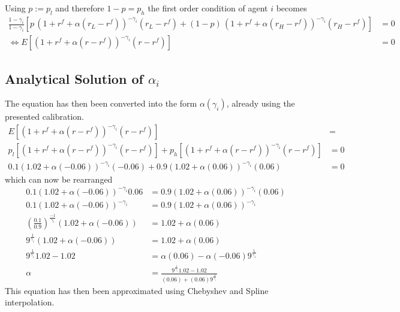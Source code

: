 \documentclass{article}
\begin{document}
\subsection{}	
Using $p:=p_l$ and therefore  $1-p=p_h$ the first order condition of agent $i$ becomes  \begin{align}\scriptstyle
\frac{1-\gamma_i}{1-\gamma_i} \left[p\, (1+r^f+\alpha(r_L-r^f))^{-\gamma_i}(r_L-r^f) +(1-p)\, (1+r^f+\alpha(r_H-r^f))^{-\gamma_i}(r_H-r^f)\right]&= 0 \\ \Leftrightarrow E\left[ (1+r^f+\alpha(r-r^f))^{-\gamma_i}(r-r^f)\right]&=0 
\end{align}

\subsection{Analytical Solution of $\alpha_i$}
The equation has then been converted into the form $\alpha ( \gamma_i )$, already using the presented calibration.
\begin{align*}
E\left[ (1+r^f+\alpha(r-r^f))^{-\gamma_i}(r-r^f)\right] &= \\
p_l \left[ (1+r^f+\alpha(r-r^f))^{-\gamma_i}(r-r^f)\right] + p_h \left[ (1+r^f+\alpha(r-r^f))^{-\gamma_i}(r-r^f)\right] &= 0\\
0.1 (1.02 +\alpha(-0.06))^{-\gamma_i}(-0.06) + 0.9 (1.02+\alpha(0.06))^{-\gamma_i}(0.06) &= 0
\end{align*}
which can now be rearranged
\begin{align*}
0.1 (1.02 +\alpha(-0.06))^{-\gamma_i}0.06&=  0.9  (1.02+\alpha(0.06))^{-\gamma_i}(0.06) \\
0.1 (1.02 +\alpha(-0.06))^{-\gamma_i}&=  0.9  (1.02+\alpha(0.06))^{-\gamma_i} \\
\left(\frac{0.1}{0.9}\right)^{\frac{-1}{\gamma_i}} \left(1.02 +\alpha(-0.06)\right)&= 1.02+\alpha(0.06)\\
9^{\frac{1}{\gamma_i}} \left(1.02 +\alpha(-0.06)\right)&= 1.02+\alpha(0.06)\\
9^{\frac{1}{\gamma_i}} 1.02 - 1.02 &= \alpha(0.06) - \alpha(-0.06)9^{\frac{1}{\gamma_i}}\\
\alpha &= \frac{9^{\frac{1}{\gamma_i}} 1.02 - 1.02 }{(0.06) + (0.06)9^{\frac{1}{\gamma_i}}}
\end{align*}
This equation has then been approximated using Chebyshev and Spline interpolation.
\end{document}
